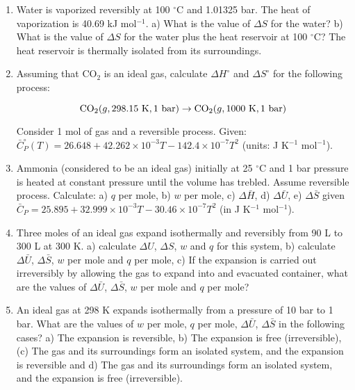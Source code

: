 \begin{enumerate}

\item Water is vaporized reversibly at 100 $^\circ$C and 1.01325 bar. The heat of vaporization is 40.69 kJ mol$^{-1}$. a) What is the value of $\Delta S$ for the water? b) What is the value of $\Delta S$ for the water plus the heat reservoir at 100 $^\circ$C? The heat reservoir is thermally isolated from its surroundings.


\item Assuming that CO$_2$ is an ideal gas, calculate $\Delta H^\circ$ and $\Delta S^\circ$ for the following process:

$$\textnormal{CO}_2(g, 298.15\textnormal{ K}, 1\textnormal{ bar}) \rightarrow \textnormal{CO}_2(g, 1000\textnormal{ K}, 1\textnormal{ bar})$$

Consider 1 mol of gas and a reversible process. Given: $\bar{C}^{\circ}_P(T) = 26.648 + 42.262 \times 10^{-3}T - 142.4 \times 10^{-7}T^2$ (units: J K$^{-1}$ mol$^{-1}$).


\item Ammonia (considered to be an ideal gas) initially at 25 $^\circ$C and 1 bar pressure is heated at constant pressure until the volume has trebled. Assume reversible process. Calculate: a) $q$ per mole, b) $w$ per mole, c) $\Delta\bar{H}$, d) $\Delta\bar{U}$, e) $\Delta\bar{S}$ given $\bar{C}_P = 25.895 + 32.999\times 10^{-3}T - 30.46\times 10^{-7}T^2$ (in J K$^{-1}$ mol$^{-1}$).


\item Three moles of an ideal gas expand isothermally and reversibly from 90 L to 300 L at 300 K. a) calculate $\Delta U$, $\Delta S$, $w$ and $q$ for this system, b) calculate $\Delta\bar{U}$, $\Delta\bar{S}$, $w$ per mole and $q$ per mole, c) If the expansion is carried out irreversibly by allowing the gas to expand into and evacuated container, what are the values of $\Delta\bar{U}$, $\Delta\bar{S}$, $w$ per mole and $q$ per mole?


\item An ideal gas at 298 K expands isothermally from a pressure of 10 bar to 1 bar. What are the values of $w$ per mole, $q$ per mole, $\Delta\bar{U}$, $\Delta\bar{S}$ in the following cases? a) The expansion is reversible, b) The expansion is free (irreversible), (c) The gas and its surroundings form an isolated system, and the expansion is reversible and d) The gas and its surroundings form an isolated system, and the expansion is free (irreversible).


\end{enumerate}
